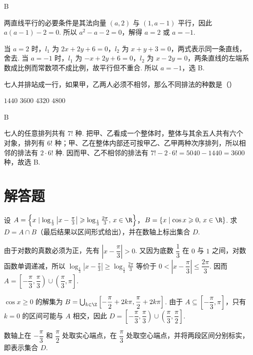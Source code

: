 \begin{answer}
B
\end{answer}

\begin{solution}
两直线平行的必要条件是其法向量 \((a,2)\) 与 \((1,a-1)\) 平行，因此
\(a(a-1)-2=0\). 所以 \(a^2-a-2=0\)，解得 \(a=2\) 或 \(a=-1\).

当 \(a=2\) 时，\(l_1\) 为 \(2x+2y+6=0\)，\(l_2\) 为 \(x+y+3=0\)，两式表示同一条直线，舍去. 当 \(a=-1\) 时，\(l_1\) 为 \(-x+2y+6=0\)，\(l_2\) 为 \(x-2y=0\)，两条直线的左端系数成比例而常数项不成比例，故平行但不重合. 所以 \(a=-1\)，选 B.
\end{solution}

\begin{problem}
七人并排站成一行，如果甲，乙两人必须不相邻，那么不同排法的种数是（\quad）

\choices
    {\(1440\)}
    {\(3600\)}
    {\(4320\)}
    {\(4800\)}
\end{problem}

\begin{answer}
B
\end{answer}

\begin{solution}
七人的任意排列共有 \(7!\) 种. 把甲、乙看成一个整体时，整体与其余五人共有六个对象，排列有 \(6!\) 种；甲、乙在整体内部还可按甲乙、乙甲两种次序排列，所以相邻的排法有 \(2\cdot6!\) 种. 因而甲、乙不相邻的排法有
\(7!-2\cdot6!=5040-1440=3600\) 种，故选 B.
\end{solution}

\section{解答题}

\begin{problem}
设 \(A=\left\{x\mid \log_{\frac{1}{3}}\left|x-\frac{\pi}{3}\right|\geqslant \log_{\frac{1}{3}}\frac{2\pi}{3},\,x\in\R\right\}\)，\(B=\left\{x\mid \cos x\geqslant 0,\,x\in\R\right\}\). 求 \(D=A\cap B\)（最后结果以区间形式给出），并在数轴上标出集合 \(D\).
\end{problem}

\begin{solution}
由于对数的真数必须为正，先有 \(\left|x-\dfrac{\pi}{3}\right|>0\). 又因为底数 \(\dfrac13\) 在 \(0\) 与 \(1\) 之间，对数函数单调递减，所以
\(\log_{\frac13}\left|x-\frac\pi3\right|\geqslant\log_{\frac13}\frac{2\pi}{3}\) 等价于 \(0<\left|x-\dfrac\pi3\right|\leqslant\dfrac{2\pi}{3}\). 因而
\(A=\left[-\dfrac\pi3,\dfrac\pi3\right)\cup\left(\dfrac\pi3,\pi\right]\).

\(\cos x\geqslant0\) 的解集为 \(B=\bigcup_{k\in\Z}\left[-\dfrac\pi2+2k\pi,\dfrac\pi2+2k\pi\right]\). 由于 \(A\subseteq\left[-\dfrac\pi3,\pi\right]\)，只有 \(k=0\) 的区间可能与 \(A\) 相交，因此
\(D=\left[-\dfrac\pi3,\dfrac\pi3\right)\cup\left(\dfrac\pi3,\dfrac\pi2\right]\).

数轴上在 \(-\dfrac\pi3\) 和 \(\dfrac\pi2\) 处取实心端点，在 \(\dfrac\pi3\) 处取空心端点，并将两段区间分别标实，即表示集合 \(D\).
\end{solution}

